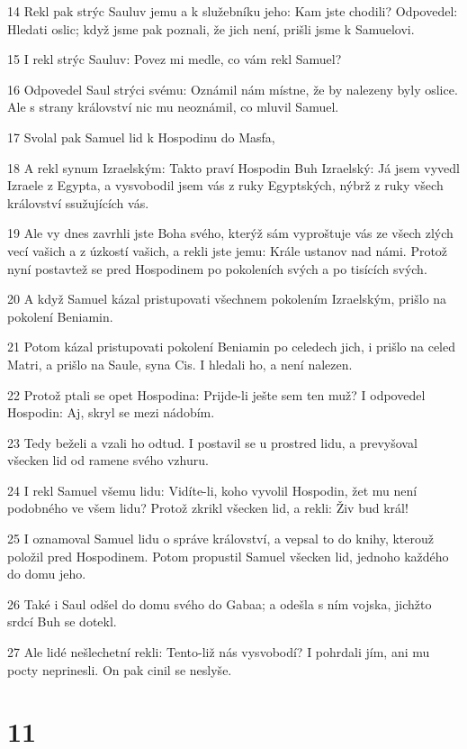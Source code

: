 \par 14 Rekl pak strýc Sauluv jemu a k služebníku jeho: Kam jste chodili? Odpovedel: Hledati oslic; když jsme pak poznali, že jich není, prišli jsme k Samuelovi.
\par 15 I rekl strýc Sauluv: Povez mi medle, co vám rekl Samuel?
\par 16 Odpovedel Saul strýci svému: Oznámil nám místne, že by nalezeny byly oslice. Ale s strany království nic mu neoznámil, co mluvil Samuel.
\par 17 Svolal pak Samuel lid k Hospodinu do Masfa,
\par 18 A rekl synum Izraelským: Takto praví Hospodin Buh Izraelský: Já jsem vyvedl Izraele z Egypta, a vysvobodil jsem vás z ruky Egyptských, nýbrž z ruky všech království ssužujících vás.
\par 19 Ale vy dnes zavrhli jste Boha svého, kterýž sám vyproštuje vás ze všech zlých vecí vašich a z úzkostí vašich, a rekli jste jemu: Krále ustanov nad námi. Protož nyní postavtež se pred Hospodinem po pokoleních svých a po tisících svých.
\par 20 A když Samuel kázal pristupovati všechnem pokolením Izraelským, prišlo na pokolení Beniamin.
\par 21 Potom kázal pristupovati pokolení Beniamin po celedech jich, i prišlo na celed Matri, a prišlo na Saule, syna Cis. I hledali ho, a není nalezen.
\par 22 Protož ptali se opet Hospodina: Prijde-li ješte sem ten muž? I odpovedel Hospodin: Aj, skryl se mezi nádobím.
\par 23 Tedy beželi a vzali ho odtud. I postavil se u prostred lidu, a prevyšoval všecken lid od ramene svého vzhuru.
\par 24 I rekl Samuel všemu lidu: Vidíte-li, koho vyvolil Hospodin, žet mu není podobného ve všem lidu? Protož zkrikl všecken lid, a rekli: Živ bud král!
\par 25 I oznamoval Samuel lidu o správe království, a vepsal to do knihy, kterouž položil pred Hospodinem. Potom propustil Samuel všecken lid, jednoho každého do domu jeho.
\par 26 Také i Saul odšel do domu svého do Gabaa; a odešla s ním vojska, jichžto srdcí Buh se dotekl.
\par 27 Ale lidé nešlechetní rekli: Tento-liž nás vysvobodí? I pohrdali jím, ani mu pocty neprinesli. On pak cinil se neslyše.

\chapter{11}

